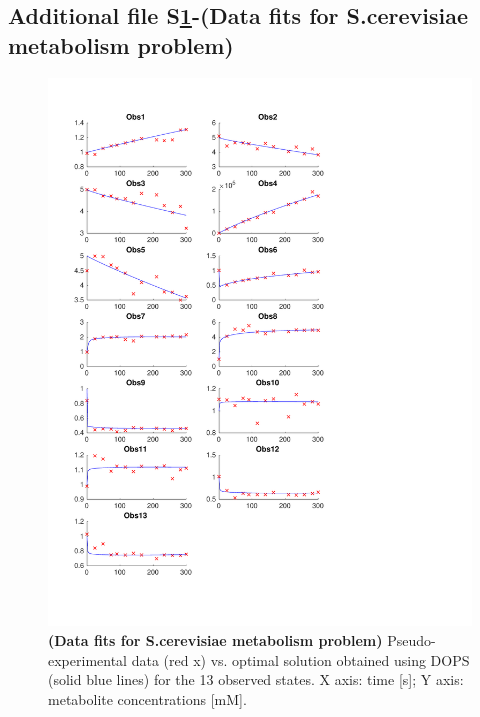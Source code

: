 \documentclass{bmcart}
\begin{document}
\begin{backmatter}
\subsection*{Additional file S\ref{fig-sims-b4}-(Data fits for S.cerevisiae metabolism problem)}
\begin{figure}[ht]
\centering
\includegraphics[width=1.00\textwidth]{./rachelfigs/RecreatedFigureS2}
\caption{\textbf {(Data fits for S.cerevisiae metabolism problem)} Pseudo-experimental data (red x) vs. optimal solution obtained using DOPS (solid blue lines) for the 13 observed states. X axis: time [s]; Y axis: metabolite concentrations [mM].
}\label{fig-sims-b4}
\end{figure}


\end{backmatter}
\end{document}
